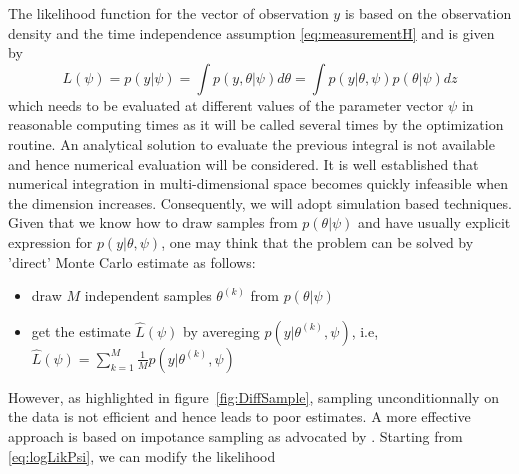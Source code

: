 \documentclass{article}
\begin{document}
The likelihood function for the vector of observation $y$ is based on the observation density
and the time independence assumption \eqref{eq:measurementH} and is given by
\begin{equation}
   L(\psi)=p(y|\psi)= \int p(y,\theta|\psi)d\theta = \int p(y|\theta,\psi) p(\theta|\psi)dz
  \label{eq:logLikPsi}
\end{equation}
which needs to be evaluated at different values of the parameter vector $\psi$ in reasonable
computing times as it will be called several times by the optimization routine. An analytical
solution to evaluate the previous integral is not available and hence numerical evaluation
will be considered. It is well established that numerical integration in multi-dimensional
space becomes quickly infeasible when the dimension increases. Consequently, we will adopt
simulation based techniques. Given that we know how to draw samples from $p(\theta|\psi) $
and have usually explicit expression for $p(y|\theta,\psi)$, one may think that the problem
can be solved by 'direct' Monte Carlo estimate as follows:
\begin{itemize}
\item draw $M$ independent samples $\theta^{(k)}$ from $p(\theta|\psi)$

\item get the estimate $\hat{L}(\psi)$ by avereging $p(y|\theta^{(k)},\psi)$, i.e,
  $\hat{L}(\psi) = \displaystyle \sum_{k=1}^M \frac{1}{M} p(y|\theta^{(k)},\psi)$
\end{itemize}
However, as highlighted in figure~\ref{fig:DiffSample}, sampling unconditionnally on the data
is not efficient and hence leads to poor estimates. A more effective approach is based on
impotance sampling as advocated by \citet[see][chap. 11]{durbin2012time}. Starting from
\eqref{eq:logLikPsi}, we can modify the likelihood
\end{document}
